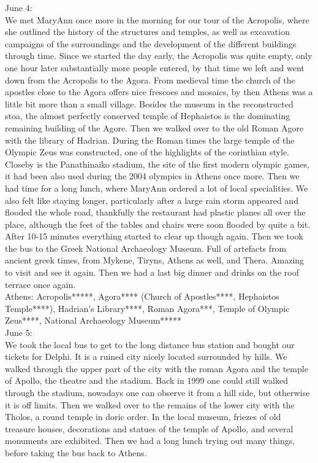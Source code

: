 June 4:\\
We met MaryAnn once more in the morning for our tour of the Acropolis, where she outlined the history of the structures and temples, as well as excavation campaigns of the surroundings and the development of the different buildings through time. Since we started the day early, the Acropolis was quite empty, only one hour later substantially more people entered, by that time we left and went down from the Acropolis to the Agora. From medieval time the church of the apostles close to the Agora offers nice frescoes and mosaics, by then Athens was a little bit more than a small village. Besides the museum in the reconstructed stoa, the almost perfectly conserved temple of Hephaistos is the dominating remaining building of the Agore. Then we walked over to the old Roman Agore with the library of Hadrian. During the Roman times the large temple of the Olympic Zeus was constructed, one of the highlights of the corinthian style. Closeby is the Panathinaiko stadium, the site of the first modern olympic games, it had been also used during the 2004 olympics in Athens once more. Then we had time for a long lunch, where MaryAnn ordered a lot of local specialities. We also felt like staying longer, particularly after a large rain storm appeared and flooded the whole road, thankfully the restaurant had plastic planes all over the place, although the feet of the tables and chairs were soon flooded by quite a bit. After 10-15 minutes everything started to clear up though again. Then we took the bus to the Greek National Archaeology Museum. Full of artefacts from ancient greek times, from Mykene, Tiryns, Athens as well, and Thera. Amazing to visit and see it again. Then we had a last big dinner and drinks on the roof terrace once again.\\

Athens: Acropolis*****, Agora**** (Church of Apostles****, Hephaistos Temple****), Hadrian's Library****, Roman Agora***, Temple of Olympic Zeus****, National Archaeology Museum*****\\

June 5:\\
We took the local bus to get to the long distance bus station and bought our tickets for Delphi. It is a ruined city nicely located surrounded by hills. We walked through the upper part of the city with the roman Agora and the temple of Apollo, the theatre and the stadium. Back in 1999 one could still walked through the stadium, nowadays one can observe it from a hill side, but otherwise it is off limits. Then we walked over to the remains of the lower city with the Tholos, a round temple in doric order. In the local museum, friezes of old treasure houses, decorations and statues of the temple of Apollo, and several monuments are exhibited. Then we had a long lunch trying out many things, before taking the bus back to Athens.\\

